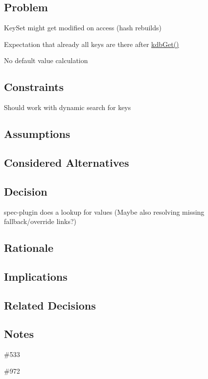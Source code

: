 \subsection*{Problem}


\begin{DoxyItemize}
\item Key\+Set might get modified on access (hash rebuilds)
\item Expectation that already all keys are there after {\ttfamily \hyperlink{group__kdb_ga28e385fd9cb7ccfe0b2f1ed2f62453a1}{kdb\+Get()}}
\item No default value calculation
\end{DoxyItemize}

\subsection*{Constraints}


\begin{DoxyItemize}
\item Should work with dynamic search for keys
\end{DoxyItemize}

\subsection*{Assumptions}

\subsection*{Considered Alternatives}

\subsection*{Decision}


\begin{DoxyItemize}
\item spec-\/plugin does a lookup for values (Maybe also resolving missing fallback/override links?)
\end{DoxyItemize}

\subsection*{Rationale}

\subsection*{Implications}

\subsection*{Related Decisions}

\subsection*{Notes}


\begin{DoxyItemize}
\item \#533
\item \#972 
\end{DoxyItemize}